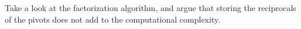   Take a look at the factorization algorithm, and argue that storing
  the reciprocals of the pivots does not add to the computational
  complexity.
